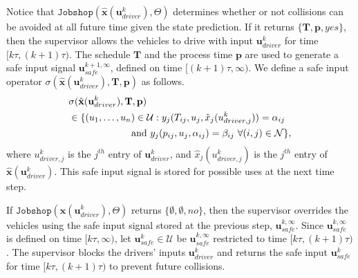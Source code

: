 \documentclass{sig-alternate}
\begin{document}
 Notice that $\mathtt{Jobshop}(\hat{\mathbf{x}}(\mathbf{u}_{driver}^k),\Theta)$ determines whether or not collisions can be avoided at all future time given the state prediction. If it returns $\{\mathbf{T,p},yes\}$, then the supervisor allows the vehicles to drive with input $\mathbf{u}_{driver}^k$ for time $[k\tau, (k+1)\tau)$. The schedule $\mathbf{T}$ and the process time $\mathbf{p}$ are used to generate a safe input signal $\mathbf{u}_{safe}^{k+1,\infty}$, defined on time $[(k+1)\tau,\infty)$. We define a safe input operator $\sigma(\hat{\mathbf{x}}(\mathbf{u}_{driver}^k),\mathbf{T,p})$ as follows.
 \begin{align}
 \begin{split}\label{equation:safe_input}
 &\sigma(\hat{\mathbf{x}}(\mathbf{u}_{driver}^k),\mathbf{T,p})\\
 &\in \{(u_1,\ldots,u_n)\in\mathcal{U}: y_j(T_{ij},u_j,\hat{x}_j(u_{driver,j}^k))=\alpha_{ij}\\
 &\hspace{0.9 in}\text{and}~y_j(p_{ij},u_j,\alpha_{ij})=\beta_{ij}~\forall (i,j)\in\mathcal{N}\},
 \end{split}
 \end{align}
 where $u_{driver,j}^k$ is the $j^{th}$ entry of $\mathbf{u}_{driver}^k$, and $\hat{x}_j(u_{driver,j}^k)$ is the $j^{th}$ entry of $\hat{\mathbf{x}}(\mathbf{u}_{driver}^k)$. This safe input signal is stored for possible uses at the next time step.
 
 If $\mathtt{Jobshop}(\hat{\mathbf{x}}(\mathbf{u}_{driver}^k),\Theta)$ returns $\{\emptyset,\emptyset,no\}$, then the supervisor overrides the vehicles using the safe input signal stored at the previous step, $\mathbf{u}_{safe}^{k,\infty}$. Since $\mathbf{u}_{safe}^{k,\infty}$ is defined on time $[k\tau, \infty)$, let $\mathbf{u}_{safe}^{k}\in\mathcal{U}$ be $\mathbf{u}_{safe}^{k,\infty}$ restricted to time $[k\tau, (k+1)\tau)$. The supervisor blocks the drivers' inputs $\mathbf{u}_{driver}^k$ and returns the safe input $\mathbf{u}_{safe}^k$ for time $[k\tau, (k+1)\tau)$ to prevent future collisions.
\end{document}
